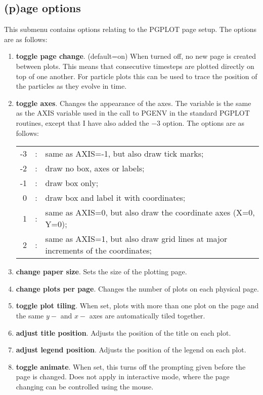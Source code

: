 \documentclass[a4paper,12pt]{article}
\begin{document}
\subsection{(p)age options}
 This submenu contains options relating to the PGPLOT page setup. The options are as follows:
\begin{enumerate}
\item \textbf{toggle page change}. (default=on) When turned off, no new page is
created between plots. This means that consecutive timesteps are plotted
directly on top of one another. For particle plots this can be used to trace the
position of the particles as they evolve in time.
\item \textbf{toggle axes}. Changes the appearance of the axes. The variable is
the same as the AXIS variable used in the call to PGENV in the standard PGPLOT
routines, except that I have also added the $-3$ option. The options are
as follows:

\begin{tabular}{rcp{}}
-3 & : & same as AXIS=-1, but also draw tick marks; \\
 -2 & : & draw no box, axes or labels; \\
 -1 & : & draw box only; \\
  0 & : & draw box and label it with coordinates; \\
  1 & : & same as AXIS=0, but also draw the coordinate axes (X=0, Y=0); \\
  2 & : & same as AXIS=1, but also draw grid lines at major increments of the coordinates;
\end{tabular}

\item \textbf{change paper size}. Sets the size of the plotting page.
\item \textbf{change plots per page}. Changes the number of plots on each
physical page.
\item \textbf{toggle plot tiling}. When set, plots with more than one plot on
the page and the same $y-$ and $x-$ axes are automatically tiled together.
\item \textbf{adjust title position}. Adjusts the position of the title on
each plot.
\item \textbf{adjust legend position}. Adjusts the position of the legend on
each plot.
\item \textbf{toggle animate}. When set, this turns off the prompting given
before the page is changed. Does not apply in interactive mode, where the page
changing can be controlled using the mouse. 
\end{enumerate}
\end{document}
